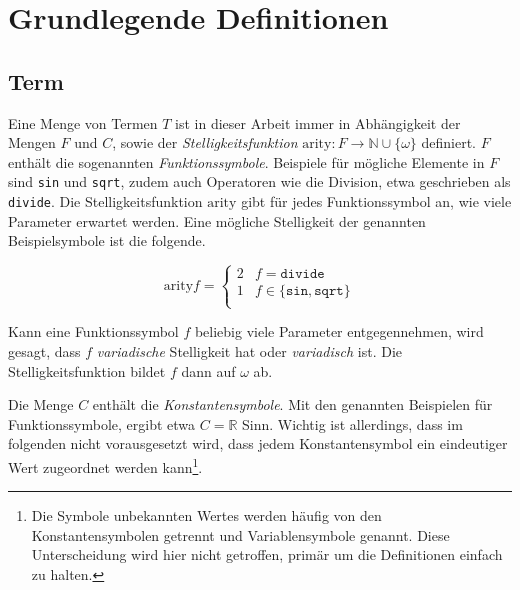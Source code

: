 \documentclass{scrartcl}
\numberwithin{figure}{section} %
\theoremstyle{definition} %
\begin{document}
\section{Grundlegende Definitionen} \label{secGrundlegendeDefinitionen}

\subsection{Term}
Eine Menge von Termen $T$ ist in dieser Arbeit immer  in Abhängigkeit der Mengen $F$ und $C$, sowie der \emph{Stelligkeitsfunktion} $\mathrm{arity} \colon F \rightarrow \mathbb{N} \cup \{\omega\}$ definiert. $F$ enthält die sogenannten \emph{Funktionssymbole}. Beispiele für mögliche Elemente in $F$ sind \texttt{sin} und \texttt{sqrt}, zudem auch Operatoren wie die Division, etwa geschrieben als \texttt{divide}. Die Stelligkeitsfunktion $\mathrm{arity}$ gibt für jedes Funktionssymbol an, wie viele Parameter erwartet werden. Eine mögliche Stelligkeit der genannten Beispielsymbole ist die folgende.

$$\mathrm{arity} f = \begin{cases}
2 & f  = \texttt{divide}\\
1 & f \in \{\texttt{sin}, \texttt{sqrt}\}\\
\end{cases}$$

Kann eine Funktionssymbol $f$ beliebig viele Parameter entgegennehmen, wird gesagt, dass $f$ \emph{variadische} Stelligkeit hat oder \emph{variadisch} ist. Die Stelligkeitsfunktion bildet $f$ dann auf $\omega$ ab. 

Die Menge $C$ enthält die \emph{Konstantensymbole}. Mit den genannten Beispielen für Funktionssymbole, ergibt etwa $C = \mathbb R$ Sinn. Wichtig ist allerdings, dass im folgenden nicht vorausgesetzt wird, dass jedem Konstantensymbol ein eindeutiger Wert zugeordnet werden kann\footnote{Die Symbole unbekannten Wertes werden häufig von den Konstantensymbolen getrennt und Variablensymbole genannt. Diese Unterscheidung wird hier nicht getroffen, primär um die Definitionen einfach zu halten.}.
\end{document}
